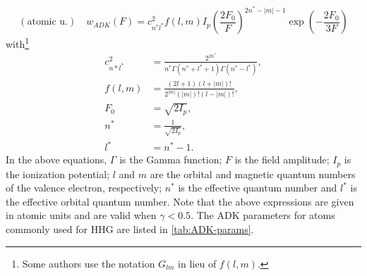 \begin{equation}
(\textrm{atomic u.}) \quad w_{ADK}(F) = c^2_{n^*l^*} f(l,m) I_p \left( \frac{2F_0}{F} \right)^{2n^*-|m|-1} \exp \left( - \frac{2 F_0}{3F} \right)
\label{eqn:ADK-rate}
\end{equation}
with\footnote{Some authors use the notation $G_{lm}$ in lieu of $f(l,m)$.}
\begin{align}
c_{n*l^*}^2 &= \frac{2^{2n^*}}{n^* \Gamma(n^* + l^* + 1) \Gamma(n^* - l^*)},  \\
f(l,m) &= \frac{(2l+1)(l+|m|)!}{2^{|m|} (|m|)! (l-|m|)!}, \\
F_0 &= \sqrt{2 I_p}, \\
n^* &= \frac{1}{\sqrt{2I_p}}, \\
l^* &= n^* - 1.
\end{align}
In the above equations, $\Gamma$ is the Gamma function; $F$ is the field amplitude; $I_p$ is the ionization potential; $l$ and $m$ are the orbital and magnetic quantum numbers of the valence electron, respectively; $n^*$ is the effective quantum number and $l^*$ is the effective orbital quantum number. Note that the above expressions are given in atomic units and are valid when $\gamma < 0.5$. The ADK parameters for atoms commonly used for HHG are listed in \cref{tab:ADK-params}.

